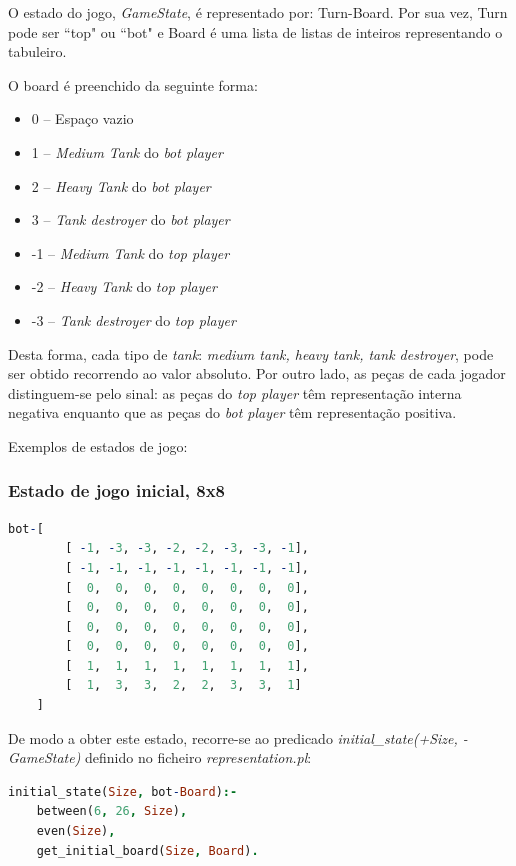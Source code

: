 \documentclass[a4paper,11pt,portuguese]{article}
\begin{document}
    O estado do jogo, \textit{GameState}, é representado por: Turn-Board. Por sua vez, Turn pode ser ``top" ou ``bot"
    e Board é uma lista de listas de inteiros representando o tabuleiro.  

    \noindent O board é preenchido da seguinte forma:
    \begin{itemize}[topsep=4pt,itemsep=2pt]
        \item  0 -- Espaço vazio
        \item  1 -- \textit{Medium Tank} do \textit{bot player}
        \item  2 -- \textit{Heavy Tank} do \textit{bot player}
        \item  3 -- \textit{Tank destroyer} do \textit{bot player}
        \item -1 -- \textit{Medium Tank} do \textit{top player}
        \item -2 -- \textit{Heavy Tank} do \textit{top player}
        \item -3 -- \textit{Tank destroyer} do \textit{top player}
    \end{itemize}  

    \vspace{1em}
    Desta forma, cada tipo de \textit{tank}: \textit{medium tank, heavy tank, tank destroyer}, pode ser obtido
    recorrendo ao valor absoluto. Por outro lado, as peças de cada jogador distinguem-se pelo sinal: as peças do \textit{top player}
    têm representação interna negativa enquanto que as peças do \textit{bot player} têm representação positiva.

    \vspace{2em}
    \noindent Exemplos de estados de jogo:
    
    \subsubsection{Estado de jogo inicial, 8x8}
\begin{lstlisting}[language=prolog]
bot-[
        [ -1, -3, -3, -2, -2, -3, -3, -1],
        [ -1, -1, -1, -1, -1, -1, -1, -1],
        [  0,  0,  0,  0,  0,  0,  0,  0],
        [  0,  0,  0,  0,  0,  0,  0,  0],
        [  0,  0,  0,  0,  0,  0,  0,  0],
        [  0,  0,  0,  0,  0,  0,  0,  0],
        [  1,  1,  1,  1,  1,  1,  1,  1],
        [  1,  3,  3,  2,  2,  3,  3,  1]
    ]
\end{lstlisting}

    \noindent De modo a obter este estado, recorre-se ao predicado
    \textit{initial\_state(+Size, -GameState)} definido no ficheiro \textit{representation.pl}:
\begin{lstlisting}[language=prolog]
% initial_state(+Size, -GameState)
initial_state(Size, bot-Board):-
    between(6, 26, Size),
    even(Size),
    get_initial_board(Size, Board).
\end{lstlisting}
\end{document}

